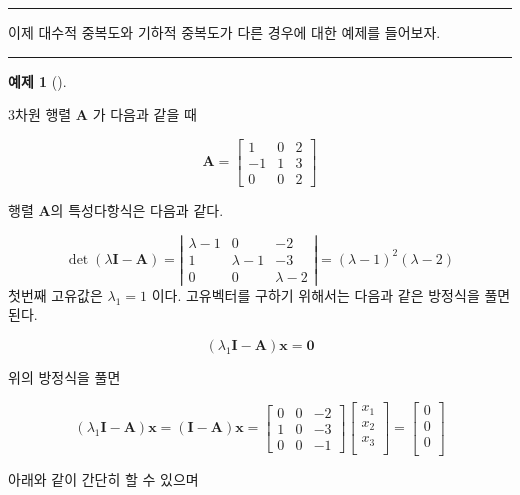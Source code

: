 \documentclass[
  11pt,
  a4paper,
  oneside]{scrbook}
\theoremstyle{definition}
\newtheorem{exercise}{예제}[chapter]
\theoremstyle{plain}
\theoremstyle{definition}
\theoremstyle{definition}
\theoremstyle{remark}
\begin{document}
\begin{center}\rule{0.5\linewidth}{0.5pt}\end{center}

이제 대수적 중복도와 기하적 중복도가 다른 경우에 대한 예제를 들어보자.

\begin{center}\rule{0.5\linewidth}{0.5pt}\end{center}

\begin{exercise}[]\protect\hypertarget{exr-Example-20-2}{}\label{exr-Example-20-2}

3차원 행렬 \(\pmb A\) 가 다음과 같을 때

\[\pmb A=\left[\begin{array}{ccc}1 & 0 & 2 \\ -1 & 1 & 3 \\ 0 & 0 & 2\end{array}\right]\]

행렬 \(\pmb A\)의 특성다항식은 다음과 같다.

\[
\operatorname{det}(\lambda \pmb I -\pmb A)= 
\left|\begin{array}{ccc}
\lambda-1 & 0 & -2 \\
1 & \lambda-1 & -3  \\
0 & 0 & \lambda-2
\end{array}\right|=(\lambda-1)^2(\lambda-2)
\] 첫번째 고유값은 \(\lambda_1=1\) 이다. 고유벡터를 구하기 위해서는
다음과 같은 방정식을 풀면 된다.

\[ (\lambda_1 \pmb I -\pmb A )\pmb x = \pmb 0  \]

위의 방정식을 풀면

\[
(\lambda_1 \pmb I -\pmb A )\pmb x= (\pmb I -\pmb A )\pmb x =
\begin{bmatrix}
0 & 0 & -2 \\
1 & 0 & -3 \\
0 & 0 & -1
\end{bmatrix}
\begin{bmatrix}
x_1 \\
x_2 \\
x_3 \\
\end{bmatrix}
=
\begin{bmatrix}
0 \\
0 \\
0 \\
\end{bmatrix}
\]

아래와 같이 간단히 할 수 있으며


\end{exercise}
\end{document}
